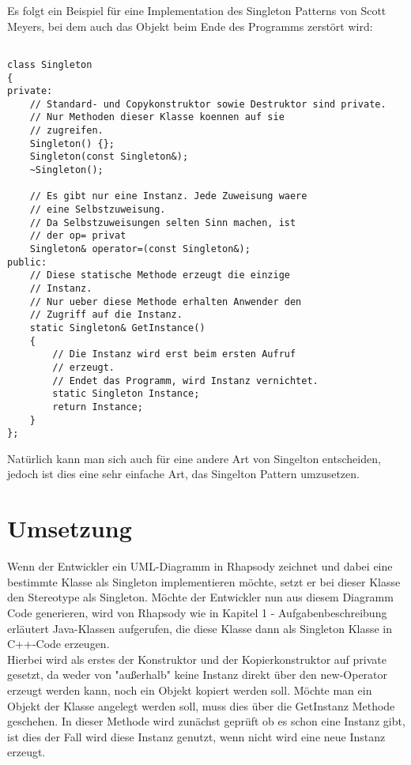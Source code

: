 Es folgt ein Beispiel für eine Implementation des Singleton Patterns von Scott Meyers, bei dem auch das Objekt beim Ende des Programms zerstört wird:
\begin{lstlisting}

class Singleton
{
private:
    // Standard- und Copykonstruktor sowie Destruktor sind private. 
    // Nur Methoden dieser Klasse koennen auf sie 
    // zugreifen.
    Singleton() {};
    Singleton(const Singleton&);
    ~Singleton();

    // Es gibt nur eine Instanz. Jede Zuweisung waere
    // eine Selbstzuweisung.
    // Da Selbstzuweisungen selten Sinn machen, ist
    // der op= privat
    Singleton& operator=(const Singleton&);
public:
    // Diese statische Methode erzeugt die einzige
    // Instanz.
    // Nur ueber diese Methode erhalten Anwender den 
    // Zugriff auf die Instanz.
    static Singleton& GetInstance() 
    {
        // Die Instanz wird erst beim ersten Aufruf
        // erzeugt.
        // Endet das Programm, wird Instanz vernichtet.
        static Singleton Instance;
        return Instance;
    }
};
\end{lstlisting}

Natürlich kann man sich auch für eine andere Art von Singelton entscheiden, jedoch ist dies eine sehr einfache Art, das Singelton Pattern umzusetzen.
\cite{singelton}\cite{singelton2}
\section{Umsetzung}

Wenn der Entwickler ein UML-Diagramm in Rhapsody zeichnet und dabei eine bestimmte Klasse als Singleton implementieren möchte, setzt er bei dieser Klasse den Stereotype als Singleton. Möchte der Entwickler nun aus diesem Diagramm Code generieren, wird von Rhapsody wie in Kapitel 1 - Aufgabenbeschreibung erläutert Java-Klassen aufgerufen, die diese Klasse dann als Singleton Klasse in C++-Code erzeugen. 
\\
Hierbei wird als erstes der Konstruktor und der Kopierkonstruktor auf private gesetzt, da weder von "außerhalb" keine Instanz direkt über den new-Operator erzeugt werden kann, noch ein Objekt kopiert werden soll. Möchte man ein Objekt der Klasse angelegt werden soll, muss dies über die GetInstanz Methode geschehen. In dieser Methode wird zunächst geprüft ob es schon eine Instanz gibt, ist dies der Fall wird diese Instanz genutzt, wenn nicht wird eine neue Instanz erzeugt.

